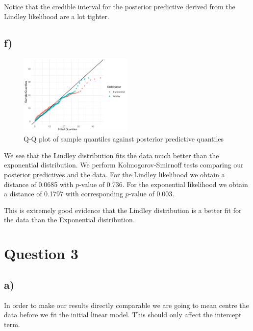 \documentclass[10pt]{extarticle}
\begin{document}
Notice that the credible interval for the posterior predictive derived from the Lindley likelihood are a lot tighter. 

\subsection*{f)}
\begin{figure}[H]
	\centering
	\includegraphics[width = 0.5\textwidth]{../qqplotlindexp}
	\caption{Q-Q plot of sample quantiles against posterior predictive quantiles}
	\label{fig:qqplots}
\end{figure}
We see that the Lindley distribution fits the data much better than the exponential distribution. We perform Kolmogorov-Smirnoff tests comparing our posterior predictives and the data. For the Lindley likelihood we obtain a distance of 0.0685 with $p$-value of 0.736. For the exponential likelihood we obtain a distance of 0.1797 with corresponding $p$-value of 0.003. 

This is extremely good evidence that the Lindley distribution is a better fit for the data than the Exponential distribution. 

\section*{Question 3}
\subsection*{a)} 

In order to make our results directly comparable we are going to mean centre the data before we fit the initial linear model. This should only affect the intercept term. 
\end{document}
